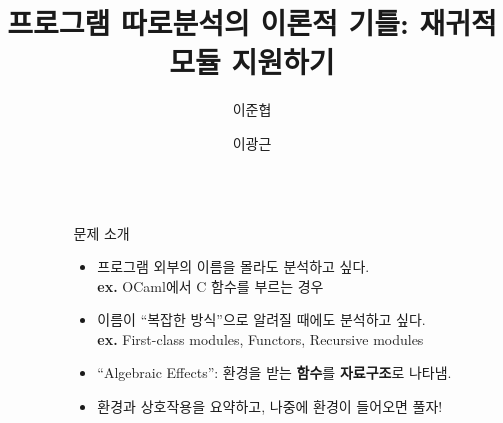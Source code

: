 \documentclass[final]{beamer}
\title{프로그램 따로분석의 이론적 기틀: 재귀적 모듈 지원하기}
\author{이준협 \and 이광근}
\institute[shortinst]{서울대학교 프로그래밍 연구실 (ROPAS)}
\newlength{\sepwidth}
\newlength{\colwidth}
\newcommand{\separatorcolumn}{\begin{column}{\sepwidth}\end{column}}
\begin{document}
\begin{frame}[t]
  \begin{columns}[t]
    \separatorcolumn

    \begin{column}{\colwidth}
      \begin{block}{문제 소개}
        \begin{itemize}
          \item 프로그램 외부의 이름을 몰라도 분석하고 싶다.\\
                \textbf{ex. }\textsf{OCaml}에서 \textsf{C} 함수를 부르는 경우
          \item 이름이 ``복잡한 방식''으로 알려질 때에도 분석하고 싶다.\\
                \textbf{ex. }First-class modules, Functors, Recursive modules
        \end{itemize}
        \begin{itemize}
          \item ``Algebraic Effects'': 환경을 받는 \textbf{함수}를 \textbf{자료구조}로 나타냄.
          \item 환경과 상호작용을 요약하고, 나중에 환경이 들어오면 풀자!
        \end{itemize}
      \end{block}


\end{column}
\end{columns}
\end{frame}
\end{document}
